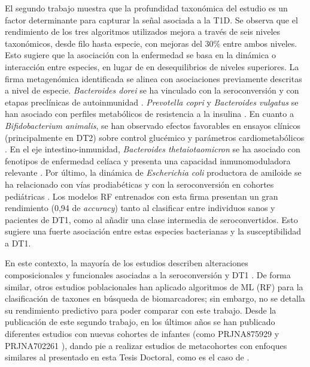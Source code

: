 El segundo trabajo \cite{paper2} muestra que la profundidad taxonómica del estudio es un factor determinante para capturar la señal asociada a la T1D. Se observa que el rendimiento de los tres algoritmos utilizados mejora a través de seis niveles taxonómicos, desde filo hasta especie, con mejoras del 30\% entre ambos niveles. Esto sugiere que la asociación con la enfermedad se basa en la dinámica o interacción entre especies, en lugar de en desequilibrios de niveles superiores. La firma metagenómica identificada se alinea con asociaciones previamente descritas a nivel de especie. \textit{Bacteroides dorei} se ha vinculado con la seroconversión y con etapas preclínicas de autoinmunidad \cite{davis2014bacteroides}. \textit{Prevotella copri} y \textit{Bacteroides vulgatus} se han asociado con perfiles metabólicos de resistencia a la insulina \cite{pedersen2016human}. En cuanto a \textit{Bifidobacterium animalis}, se han observado efectos favorables en ensayos clínicos (principalmente en DT2) sobre control glucémico y parámetros cardiometabólicos \cite{stenman2016probiotic, khiaolaongam2025bifidobacterium}. En el eje intestino-inmunidad, \textit{Bacteroides thetaiotaomicron} se ha asociado con fenotipos de enfermedad celíaca y presenta una capacidad inmunomoduladora relevante \cite{sanchez2010intestinal}. Por último, la dinámica de \textit{Escherichia coli} productora de amiloide se ha relacionado con vías prodiabéticas y con la seroconversión en cohortes pediátricas \cite{tetz2019type}. Los modelos RF entrenados con esta firma presentan un gran rendimiento (0,94 de \textit{accuracy}) tanto al clasificar entre individuos sanos y pacientes de DT1, como al añadir una clase intermedia de seroconvertidos. Esto sugiere una fuerte asociación entre estas especies bacterianas y la susceptibilidad a DT1.

En este contexto, la mayoría de los estudios describen alteraciones composicionales y funcionales asociadas a la seroconversión y DT1 \cite{vatanen2018human, kostic2015dynamics}. De forma similar, otros estudios poblacionales \cite{belteky2023infant} han aplicado algoritmos de ML (RF) para la clasificación de taxones en búsqueda de biomarcadores; sin embargo, no se detalla su rendimiento predictivo para poder comparar con este trabajo. Desde la publicación de este segundo trabajo, en los últimos años se han publicado diferentes estudios con nuevas cohortes de infantes (como PRJNA875929 \cite{belteky2023infant} y PRJNA702261 \cite{del2022gut}), dando pie a realizar estudios de metacohortes con enfoques similares al presentado en esta Tesis Doctoral, como es el caso de \cite{liu2024predicting}.



